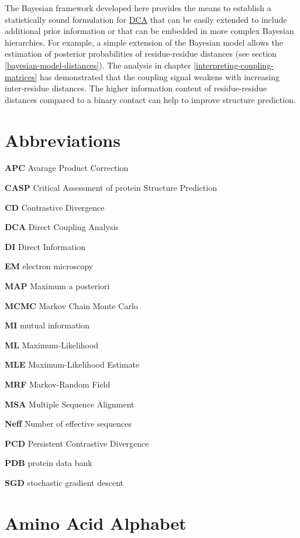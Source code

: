\documentclass[11pt,a4paper,twoside]{book}
\theoremstyle{definition}
\theoremstyle{definition}
\theoremstyle{remark}
\begin{document}
The Bayesian framework developed here provides the means to establish a
statistically sound formulation for \protect\hyperlink{abbrev}{DCA} that
can be easily extended to include additional prior information or that
can be embedded in more complex Bayesian hierarchies. For example, a
simple extension of the Bayesian model allows the estimation of
posterior probabilities of residue-residue distances (see section
\ref{bayesian-model-distances}). The analysis in chapter
\ref{interpreting-coupling-matrices} has demonstrated that the coupling
signal weakens with increasing inter-residue distances. The higher
information content of residue-residue distances compared to a binary
contact can help to improve structure prediction.

\appendix


{}

\hypertarget{abbrev}{\chapter{Abbreviations}\label{abbrev}}

\textbf{APC} Avarage Product Correction

\textbf{CASP} Critical Assessment of protein Structure Prediction

\textbf{CD} Contrastive Divergence

\textbf{DCA} Direct Coupling Analysis

\textbf{DI} Direct Information

\textbf{EM} electron microscopy

\textbf{MAP} Maximum a posteriori

\textbf{MCMC} Markov Chain Monte Carlo

\textbf{MI} mutual information

\textbf{ML} Maximum-Likelihood

\textbf{MLE} Maximum-Likelihood Estimate

\textbf{MRF} Markov-Random Field

\textbf{MSA} Multiple Sequence Alignment

\textbf{Neff} Number of effective sequences

\textbf{PCD} Persistent Contrastive Divergence

\textbf{PDB} protein data bank

\textbf{SGD} stochastic gradient descent

\chapter{Amino Acid Alphabet}\label{amino-acids}
\end{document}
